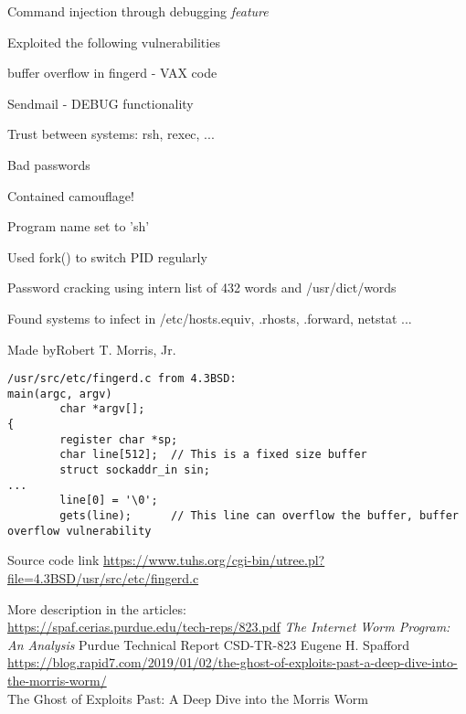 \documentclass[Screen16to9,17pt]{foils}
\begin{document}
\begin{list2}
    \item Command injection through debugging \emph{feature}
\end{list2}



\begin{list1}
\item Exploited the following vulnerabilities
\begin{list2}
\item buffer overflow in fingerd - VAX code
\item Sendmail - DEBUG functionality
\item Trust between systems: rsh, rexec, ...
\item Bad passwords
\end{list2}
\item Contained camouflage!
\begin{list2}
\item Program name set to 'sh'
\item Used fork() to switch PID regularly
\item Password cracking using intern list of 432 words and /usr/dict/words
\item Found systems to infect in /etc/hosts.equiv, .rhosts, .forward, netstat ...
\end{list2}
\item Made byRobert T. Morris, Jr.
\end{list1}



\begin{verbatim}
/usr/src/etc/fingerd.c from 4.3BSD:
main(argc, argv)
        char *argv[];
{
        register char *sp;
        char line[512];  // This is a fixed size buffer
        struct sockaddr_in sin;
...
        line[0] = '\0';
        gets(line);      // This line can overflow the buffer, buffer overflow vulnerability
\end{verbatim}

Source code link \url{https://www.tuhs.org/cgi-bin/utree.pl?file=4.3BSD/usr/src/etc/fingerd.c}

More description in the articles:\\
{\footnotesize\url{https://spaf.cerias.purdue.edu/tech-reps/823.pdf}} \emph{The Internet Worm Program: An Analysis}
Purdue Technical Report CSD-TR-823
Eugene H. Spafford\\ {\footnotesize\url{https://blog.rapid7.com/2019/01/02/the-ghost-of-exploits-past-a-deep-dive-into-the-morris-worm/}}\\ The Ghost of Exploits Past: A Deep Dive into the Morris Worm
\end{document}
